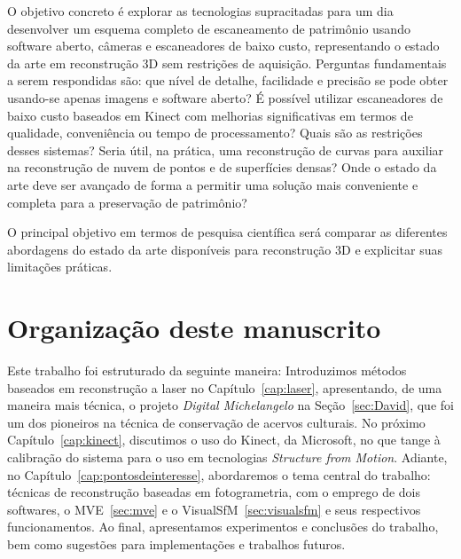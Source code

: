 O objetivo concreto é explorar as tecnologias supracitadas para
um dia desenvolver um esquema completo de escaneamento de patrimônio usando software aberto, câmeras e
escaneadores de baixo custo, representando o estado da arte em reconstrução 3D sem
restrições de aquisição. Perguntas fundamentais a serem respondidas são: que
nível de detalhe, facilidade e precisão se pode obter usando-se apenas imagens e software
aberto? É possível utilizar escaneadores de baixo custo baseados em Kinect com
melhorias significativas em termos de qualidade, conveniência ou tempo de
processamento?  Quais são as restrições desses sistemas? Seria útil, na prática,
uma reconstrução de curvas para auxiliar na reconstrução de nuvem de pontos e de
superfícies densas? Onde o estado da arte deve ser avançado de forma a permitir
uma solução mais conveniente e completa para a preservação de patrimônio?

O principal objetivo em termos de pesquisa científica será comparar as
diferentes abordagens do estado da arte disponíveis para reconstrução 3D e
explicitar suas limitações práticas.

\section*{Organização deste manuscrito}

Este trabalho foi estruturado da seguinte maneira: Introduzimos
métodos baseados em reconstrução a laser no Capítulo~\ref{cap:laser},
apresentando, de uma maneira mais técnica, o projeto \emph{Digital
Michelangelo} na Seção~\ref{sec:David}, que foi um dos pioneiros na técnica de
conservação de acervos culturais. No próximo Capítulo~\ref{cap:kinect},
discutimos o uso do Kinect, da Microsoft, no que tange à calibração do sistema
para o uso em tecnologias \emph{Structure from Motion}.  Adiante, no
Capítulo~\ref{cap:pontosdeinteresse}, abordaremos o tema central do trabalho:
técnicas de reconstrução baseadas em fotogrametria, com o emprego de dois
softwares, o MVE~\ref{sec:mve} e o VisualSfM~\ref{sec:visualsfm} e seus
respectivos funcionamentos. Ao final, apresentamos experimentos e conclusões
do trabalho, bem como sugestões para implementações e trabalhos futuros.

